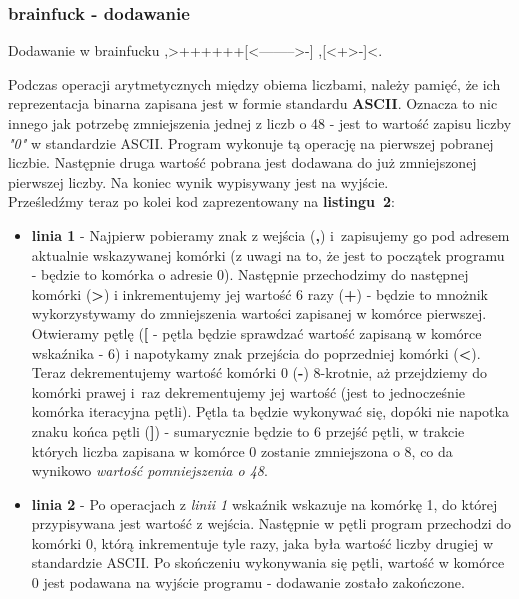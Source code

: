\documentclass[fleqn,10pt]{SelfArx} %
\begin{document}
\subsubsection{brainfuck - dodawanie}

\begin{sexylisting}{Dodawanie w brainfucku}
,>++++++[<-------->-]
,[<+>-]<.
\end{sexylisting}

Podczas operacji arytmetycznych między obiema liczbami, należy pamięć, że ich reprezentacja binarna zapisana jest w formie standardu \textbf{ASCII}\cite{ASCII:table}.
Oznacza to nic innego jak potrzebę zmniejszenia jednej z liczb o 48 - jest to wartość zapisu liczby \textit{"0"} w standardzie ASCII. 
Program wykonuje tą operację na pierwszej pobranej liczbie. Następnie druga wartość pobrana jest dodawana do już zmniejszonej pierwszej liczby.
Na koniec wynik wypisywany jest na wyjście.\\
Prześledźmy teraz po kolei kod zaprezentowany na \textbf{listingu~2}:
\begin{itemize}
	\item \textbf{linia 1} - 
Najpierw pobieramy znak z wejścia (\textbf{,}) i~zapisujemy go pod adresem aktualnie wskazywanej komórki (z uwagi na to, że jest to początek programu - będzie to komórka o adresie 0).
Następnie przechodzimy do następnej komórki (\textbf{>}) i inkrementujemy jej wartość 6 razy (\textbf{+}) - będzie to mnożnik wykorzystywamy do zmniejszenia wartości zapisanej w komórce pierwszej. 
Otwieramy pętlę (\textbf{[} - pętla będzie sprawdzać wartość zapisaną w komórce wskaźnika - 6) i napotykamy znak przejścia do poprzedniej komórki (\textbf{<}).
Teraz dekrementujemy wartość komórki 0 (\textbf{-}) 8-krotnie, aż przejdziemy do komórki prawej i~raz dekrementujemy jej wartość (jest to jednocześnie komórka iteracyjna pętli).
Pętla ta będzie wykonywać się, dopóki nie napotka znaku końca pętli (\textbf{]}) - sumarycznie będzie to 6 przejść pętli, w trakcie których liczba zapisana w komórce 0 zostanie zmniejszona o 8, 
co da wynikowo \textit{wartość pomniejszenia o 48}.
	\item \textbf{linia 2} -
Po operacjach z \textit{linii 1} wskaźnik wskazuje na komórkę 1, do której przypisywana jest wartość z wejścia. Następnie w pętli program przechodzi do komórki 0,
którą inkrementuje tyle razy, jaka była wartość liczby drugiej w standardzie ASCII. Po skończeniu wykonywania się pętli, wartość w komórce 0 jest podawana na wyjście programu - dodawanie zostało zakończone.
\end{itemize}
\end{document}
